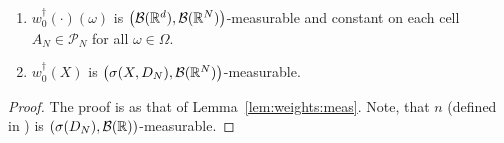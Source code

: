\begin{lemma}
  \label{lem:weights:meas:0}
  \quad
  \begin{enumerate}[label=(\roman*)]
\item
  $w_0^\dagger(\cdot)(\omega)$ is 
  $\left(
    \mathcal{B}(\mathbb{R}^d),\mathcal{B}(\mathbb{R}^N)
  \right)$-measurable
  and
  constant on each cell 
  $A_N\in\mathcal{P}_N$
  for all $\omega\in\Omega$. 
\item
  $w_0^\dagger(X)$ is $\left(
    \sigma(X,D_N),\mathcal{B}(\mathbb{R}^N)
  \right)$-measurable. 
  \end{enumerate}
\end{lemma}
\begin{proof}
The proof is as that of Lemma~\ref{lem:weights:meas}.
Note, that $n$ (defined in ) is 
$
\left( 
\sigma(D_N),\mathcal{B}(\mathbb{R})
\right)
$-measurable.
\end{proof}


